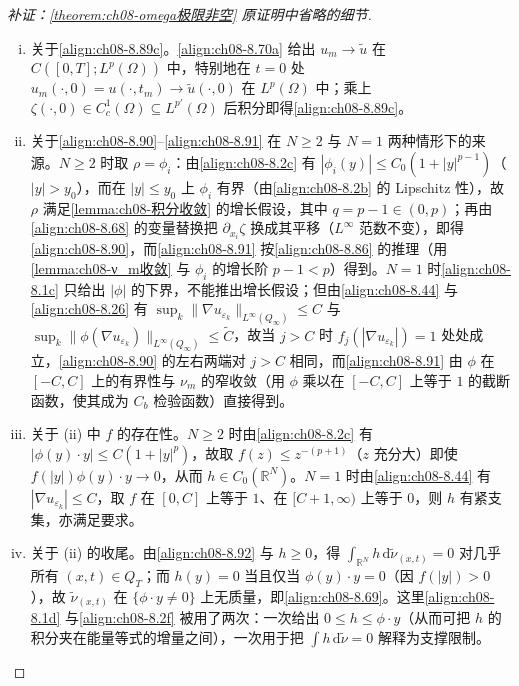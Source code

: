 \documentclass[../../main.tex]{subfiles}%
\begin{document}
\begin{proof}[补证：\cref{theorem:ch08-omega极限非空} 原证明中省略的细节]
\begin{enumerate}[(i)]
\item 关于\eqref{align:ch08-8.89c}。\eqref{align:ch08-8.70a} 给出 $u_m\to\tilde u$ 在 $C([0,T];L^p(\Omega))$ 中，特别地在 $t=0$ 处 $u_m(\cdot,0)=u(\cdot,t_m)\to\tilde u(\cdot,0)$ 在 $L^p(\Omega)$ 中；乘上 $\zeta(\cdot,0)\in C^1_c(\Omega)\subseteq L^{p'}(\Omega)$ 后积分即得\eqref{align:ch08-8.89c}。
\item 关于\eqref{align:ch08-8.90}--\eqref{align:ch08-8.91} 在 $N\geqslant2$ 与 $N=1$ 两种情形下的来源。$N\geqslant2$ 时取 $\rho=\phi_i$：由\eqref{align:ch08-8.2c} 有 $|\phi_i(y)|\leqslant C_0(1+|y|^{p-1})$（$|y|>y_0$），而在 $|y|\leqslant y_0$ 上 $\phi_i$ 有界（由\eqref{align:ch08-8.2b} 的 Lipschitz 性），故 $\rho$ 满足\cref{lemma:ch08-积分收敛} 的增长假设，其中 $q=p-1\in(0,p)$；再由\eqref{align:ch08-8.68} 的变量替换把 $\partial_{x_i}\zeta$ 换成其平移（$L^\infty$ 范数不变），即得\eqref{align:ch08-8.90}，而\eqref{align:ch08-8.91} 按\eqref{align:ch08-8.86} 的推理（用\cref{lemma:ch08-ν_m收敛} 与 $\phi_i$ 的增长阶 $p-1<p$）得到。$N=1$ 时\eqref{align:ch08-8.1c} 只给出 $|\phi|$ 的下界，不能推出增长假设；但由\eqref{align:ch08-8.44} 与\eqref{align:ch08-8.26} 有 $\sup_k\|\nabla u_{\varepsilon_k}\|_{L^\infty(Q_\infty)}\leqslant C$ 与 $\sup_k\|\phi(\nabla u_{\varepsilon_k})\|_{L^\infty(Q_\infty)}\leqslant\widetilde C$，故当 $j>C$ 时 $f_j(|\nabla u_{\varepsilon_k}|)=1$ 处处成立，\eqref{align:ch08-8.90} 的左右两端对 $j>C$ 相同，而\eqref{align:ch08-8.91} 由 $\phi$ 在 $[-C,C]$ 上的有界性与 $\nu_m$ 的窄收敛（用 $\phi$ 乘以在 $[-C,C]$ 上等于 $1$ 的截断函数，使其成为 $C_b$ 检验函数）直接得到。
\item 关于 (ii) 中 $f$ 的存在性。$N\geqslant2$ 时由\eqref{align:ch08-8.2c} 有 $|\phi(y)\cdot y|\leqslant C(1+|y|^p)$，故取 $f(z)\leqslant z^{-(p+1)}$（$z$ 充分大）即使 $f(|y|)\phi(y)\cdot y\to0$，从而 $h\in C_0(\mathbb{R}^N)$。$N=1$ 时由\eqref{align:ch08-8.44} 有 $|\nabla u_{\varepsilon_k}|\leqslant C$，取 $f$ 在 $[0,C]$ 上等于 $1$、在 $[C+1,\infty)$ 上等于 $0$，则 $h$ 有紧支集，亦满足要求。
\item 关于 (ii) 的收尾。由\eqref{align:ch08-8.92} 与 $h\geqslant0$，得 $\int_{\mathbb{R}^N}h\,\mathrm{d}\tilde\nu_{(x,t)}=0$ 对几乎所有 $(x,t)\in Q_T$；而 $h(y)=0$ 当且仅当 $\phi(y)\cdot y=0$（因 $f(|y|)>0$），故 $\tilde\nu_{(x,t)}$ 在 $\{\phi\cdot y\neq0\}$ 上无质量，即\eqref{align:ch08-8.69}。这里\eqref{align:ch08-8.1d} 与\eqref{align:ch08-8.2f} 被用了两次：一次给出 $0\leqslant h\leqslant\phi\cdot y$（从而可把 $h$ 的积分夹在能量等式的增量之间），一次用于把 $\int h\,\mathrm{d}\tilde\nu=0$ 解释为支撑限制。
\end{enumerate}
\end{proof}
\end{document}
